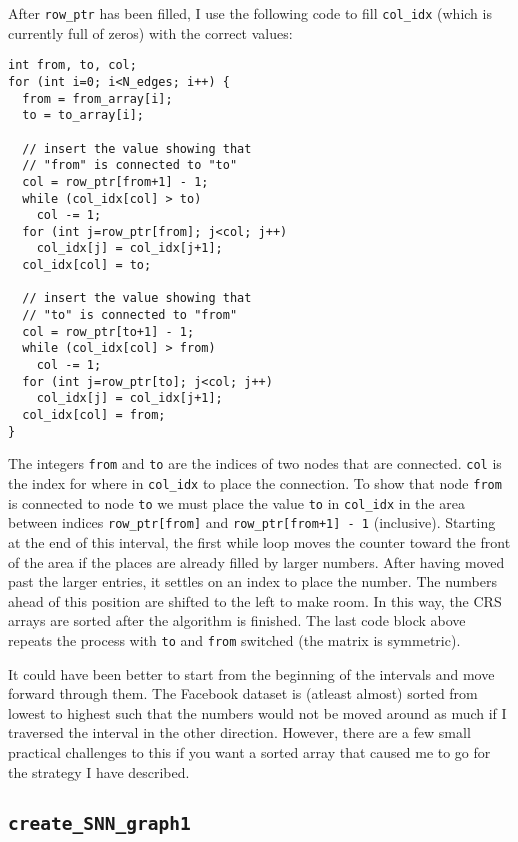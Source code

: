 \documentclass[reprint, english,notitlepage,nofootinbib]{revtex4-1}  %
\begin{document}
After \verb|row_ptr| has been filled, I use the following code to fill \verb|col_idx| (which is currently full of zeros) with the correct values:
\begin{verbatim}
int from, to, col;
for (int i=0; i<N_edges; i++) {
  from = from_array[i];
  to = to_array[i];

  // insert the value showing that
  // "from" is connected to "to"
  col = row_ptr[from+1] - 1;
  while (col_idx[col] > to)
    col -= 1;
  for (int j=row_ptr[from]; j<col; j++)
    col_idx[j] = col_idx[j+1];
  col_idx[col] = to;

  // insert the value showing that
  // "to" is connected to "from"
  col = row_ptr[to+1] - 1;
  while (col_idx[col] > from)
    col -= 1;
  for (int j=row_ptr[to]; j<col; j++)
    col_idx[j] = col_idx[j+1];
  col_idx[col] = from;
}
\end{verbatim}
The integers \verb|from| and \verb|to| are the indices of two nodes that are connected. \verb|col| is the index for where in \verb|col_idx| to place the connection. To show that node \verb|from| is connected to node \verb|to| we must place the value \verb|to| in \verb|col_idx| in the area between indices \verb|row_ptr[from]| and \verb|row_ptr[from+1] - 1| (inclusive). Starting at the end of this interval, the first while loop moves the counter toward the front of the area if the places are already filled by larger numbers. After having moved past the larger entries, it settles on an index to place the number. The numbers ahead of this position are shifted to the left to make room. In this way, the CRS arrays are sorted after the algorithm is finished. The last code block above repeats the process with \verb|to| and \verb|from| switched (the matrix is symmetric).

It could have been better to start from the beginning of the intervals and move forward through them. The Facebook dataset is (atleast almost) sorted from lowest to highest such that the numbers would not be moved around as much if I traversed the interval in the other direction. However, there are a few small practical challenges to this if you want a sorted array that caused me to go for the strategy I have described.


\subsection{\texttt{create\_SNN\_graph1}}
\end{document}
